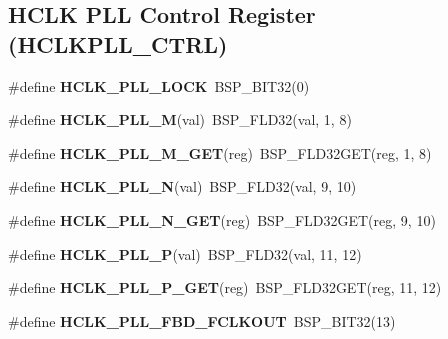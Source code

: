 \subsection*{H\+C\+LK P\+LL Control Register (H\+C\+L\+K\+P\+L\+L\+\_\+\+C\+T\+RL)}
\begin{DoxyCompactItemize}
\item 
\mbox{\label{group__lpc32xx__reg_gae5b869d67e6452397858cdb594a0e5db}} 
\#define {\bfseries H\+C\+L\+K\+\_\+\+P\+L\+L\+\_\+\+L\+O\+CK}~B\+S\+P\+\_\+\+B\+I\+T32(0)
\item 
\mbox{\label{group__lpc32xx__reg_gaf919e8341464c9c6db6618b607eb4c10}} 
\#define {\bfseries H\+C\+L\+K\+\_\+\+P\+L\+L\+\_\+M}(val)~B\+S\+P\+\_\+\+F\+L\+D32(val, 1, 8)
\item 
\mbox{\label{group__lpc32xx__reg_gaa7e972edadfe8178d869e6fb034dc129}} 
\#define {\bfseries H\+C\+L\+K\+\_\+\+P\+L\+L\+\_\+\+M\+\_\+\+G\+ET}(reg)~B\+S\+P\+\_\+\+F\+L\+D32\+G\+ET(reg, 1, 8)
\item 
\mbox{\label{group__lpc32xx__reg_ga2e748fee39d4478c048cf8dc37e79dea}} 
\#define {\bfseries H\+C\+L\+K\+\_\+\+P\+L\+L\+\_\+N}(val)~B\+S\+P\+\_\+\+F\+L\+D32(val, 9, 10)
\item 
\mbox{\label{group__lpc32xx__reg_ga7a5a88b623bb3c2a54e7193b7e3a4efd}} 
\#define {\bfseries H\+C\+L\+K\+\_\+\+P\+L\+L\+\_\+\+N\+\_\+\+G\+ET}(reg)~B\+S\+P\+\_\+\+F\+L\+D32\+G\+ET(reg, 9, 10)
\item 
\mbox{\label{group__lpc32xx__reg_ga3e16f10ddd8021e9b057e291f20afc23}} 
\#define {\bfseries H\+C\+L\+K\+\_\+\+P\+L\+L\+\_\+P}(val)~B\+S\+P\+\_\+\+F\+L\+D32(val, 11, 12)
\item 
\mbox{\label{group__lpc32xx__reg_ga953015d1970dc3441dc807a9d9c0be94}} 
\#define {\bfseries H\+C\+L\+K\+\_\+\+P\+L\+L\+\_\+\+P\+\_\+\+G\+ET}(reg)~B\+S\+P\+\_\+\+F\+L\+D32\+G\+ET(reg, 11, 12)
\item 
\mbox{\label{group__lpc32xx__reg_gac318ee41317e7d8ec9f49cbb334a8d35}} 
\#define {\bfseries H\+C\+L\+K\+\_\+\+P\+L\+L\+\_\+\+F\+B\+D\+\_\+\+F\+C\+L\+K\+O\+UT}~B\+S\+P\+\_\+\+B\+I\+T32(13)

\end{DoxyCompactItemize}
